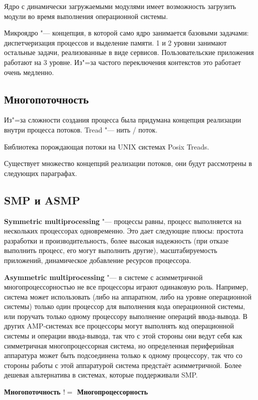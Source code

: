 \documentclass[bachelor, och, pract]{SCWorks}
\theoremstyle{remark}
\begin{document}
    Ядро с динамически загружаемыми модулями имеет возможность загрузить модули во время выполнения операционной системы.
    
    Микроядро "--- концепция, в которой само ядро занимается базовыми задачами: диспетчеризация процессов и выделение памяти. 1 и 2 уровни занимают остальные задачи, реализованные в виде сервисов. Пользовательские приложения работают на 3 уровне. Из"=за частого переключения контекстов это работает очень медленно. 

    \subsection{Многопоточность}
    Из"=за сложности создания процесса была придумана концепция реализации внутри процесса потоков. Tread "--- нить / поток.

    Библиотека порождающая потоки на UNIX системах Posix Treads.
    
    Существует множество концепций реализации потоков, они будут рассмотрены в следующих параграфах.

    \subsection{SMP и ASMP}
    
    \textbf{Symmetric multiprocessing} "--- процессы равны, процесс выполняется на нескольких процессорах одновременно. Это дает следующие плюсы: простота разработки и производительность, более высокая надежность (при отказе выполнить процесс, его могут выполнить другие), масштабируемость приложений, динамическое добавление ресурсов процессора. 

    \textbf{Asymmetric multiprocessing} "--- в системе с асимметричной многопроцессорностью не все процессоры играют одинаковую роль. Например, система может использовать (либо на аппаратном, либо на уровне операционной системы) только один процессор для выполнения кода операционной системы, или поручать только одному процессору выполнение операций ввода-вывода. В других AMP-системах все процессоры могут выполнять код операционной системы и операции ввода-вывода, так что с этой стороны они ведут себя как симметричная многопроцессорная система, но определенная периферийная аппаратура может быть подсоединена только к одному процессору, так что со стороны работы с этой аппаратурой система предстаёт асимметричной. Более дешевая альтернатива в системах, которые поддерживали SMP.
 
    \textbf{Многопоточность $!=$ Многопроцессорность}
\end{document}

